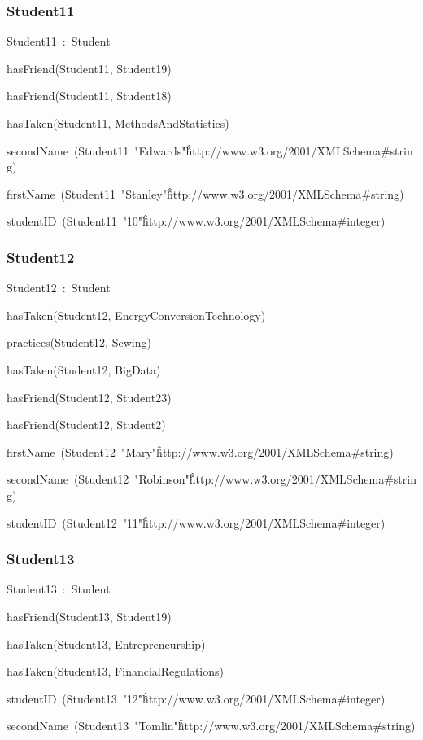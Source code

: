 \documentclass{article}
\begin{document}
\subsubsection*{Student11}

Student11~:~Student

hasFriend(Student11, Student19)

hasFriend(Student11, Student18)

hasTaken(Student11, MethodsAndStatistics)

secondName~(Student11~"Edwards"\^\^http://www.w3.org/2001/XMLSchema#string)

firstName~(Student11~"Stanley"\^\^http://www.w3.org/2001/XMLSchema#string)

studentID~(Student11~"10"\^\^http://www.w3.org/2001/XMLSchema#integer)

\subsubsection*{Student12}

Student12~:~Student

hasTaken(Student12, EnergyConversionTechnology)

practices(Student12, Sewing)

hasTaken(Student12, BigData)

hasFriend(Student12, Student23)

hasFriend(Student12, Student2)

firstName~(Student12~"Mary"\^\^http://www.w3.org/2001/XMLSchema#string)

secondName~(Student12~"Robinson"\^\^http://www.w3.org/2001/XMLSchema#string)

studentID~(Student12~"11"\^\^http://www.w3.org/2001/XMLSchema#integer)

\subsubsection*{Student13}

Student13~:~Student

hasFriend(Student13, Student19)

hasTaken(Student13, Entrepreneurship)

hasTaken(Student13, FinancialRegulations)

studentID~(Student13~"12"\^\^http://www.w3.org/2001/XMLSchema#integer)

secondName~(Student13~"Tomlin"\^\^http://www.w3.org/2001/XMLSchema#string)
\end{document}
